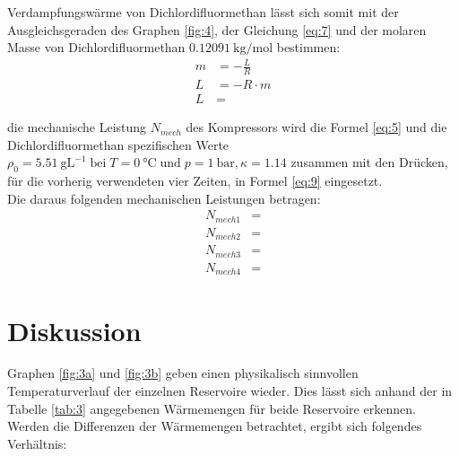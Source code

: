 \justifying Verdampfungswärme von Dichlordifluormethan lässt sich somit mit der Ausgleichsgeraden des Graphen \ref{fig:4}, 
der Gleichung \eqref{eq:7} und der molaren Masse von Dichlordifluormethan $\SI{0.12091}{\kilo\gram\per\mole}$ \cite{Molmasse} bestimmen:
\begin{subequations}
\begin{align}
    m &= -\frac{L}{R} \label{eq:17a} \\
    L &= -R \cdot m \label{eq:17b}\\
    L &= \text{}\label{eq:17c}
\end{align}
\end{subequations}

\justifying die mechanische Leistung $N_{mech}$ des Kompressors wird die Formel \eqref{eq:5} und die Dichlordifluormethan spezifischen Werte 
\cite{V206} $\rho_0 = \SI{5.51}{\gram\liter\tothe{-1}}\; \text{bei}\; T = \SI{0}{\celsius}\; \text{und}\; p = \SI{1}{\bar}, \kappa = 1.14$ zusammen mit den
Drücken, für die vorherig verwendeten vier Zeiten, in Formel \eqref{eq:9} eingesetzt. \\
Die daraus folgenden mechanischen Leistungen betragen:
\begin{subequations}
\begin{align}
    N_{mech1} &= \text{} \label{eq:18a}\\
    N_{mech2} &= \text{} \label{eq:18b}\\
    N_{mech3} &= \text{} \label{eq:18c}\\
    N_{mech4} &= \text{} \label{eq:18d}
\end{align}
\end{subequations}
\newpage




\section{Diskussion} \label{sec:6}

\justifying Graphen \ref{fig:3a} und \ref{fig:3b} geben einen physikalisch sinnvollen Temperaturverlauf der einzelnen Reservoire 
wieder. Dies lässt sich anhand der in Tabelle \ref{tab:3} angegebenen Wärmemengen für beide Reservoire erkennen. Werden die Differenzen der 
Wärmemengen betrachtet, ergibt sich folgendes Verhältnis:

